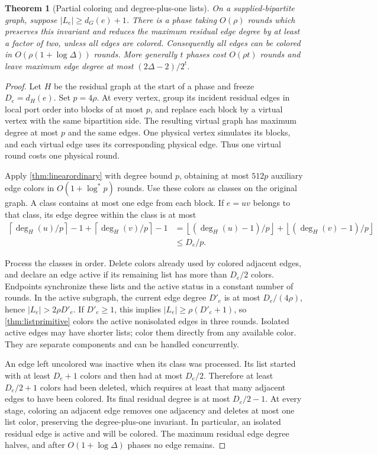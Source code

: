 \documentclass[11pt]{article}
\newtheorem{theorem}{Theorem}[section]
\theoremstyle{definition}
\theoremstyle{remark}
\newcommand{\ceil}[1]{\left\lceil #1\right\rceil}
\newcommand{\floor}[1]{\left\lfloor #1\right\rfloor}
\newcommand{\abs}[1]{\left|#1\right|}
\newcommand{\logstar}{\log^*}
\begin{document}
\begin{theorem}[Partial coloring and degree-plus-one lists]\label{thm:partial}
On a supplied-bipartite graph, suppose $\abs{L_e}\ge d_G(e)+1$.
There is a phase taking $O(\rho)$ rounds which preserves this invariant
and reduces the maximum residual edge degree by at least a factor of
two, unless all edges are colored. Consequently all edges can be
colored in $O(\rho(1+\log\Delta))$ rounds. More generally $t$ phases
cost $O(\rho t)$ rounds and leave maximum edge degree at most
$(2\Delta-2)/2^t$.
\end{theorem}
\begin{proof}
Let $H$ be the residual graph at the start of a phase and freeze
$D_e=d_H(e)$. Set $p=4\rho$. At every vertex, group its incident
residual edges in local port order into blocks of at most $p$, and
replace each block by a virtual vertex with the same bipartition side.
The resulting virtual graph has maximum degree at most $p$ and the
same edges. One physical vertex simulates its blocks, and each virtual
edge uses its corresponding physical edge. Thus one virtual round
costs one physical round.

Apply \cref{thm:linearordinary} with degree bound $p$, obtaining at
most $512p$ auxiliary edge colors in $O(1+\logstar p)$ rounds. Use
these colors as classes on the original graph. A class contains at
most one edge from each block. If $e=uv$ belongs to that class, its
edge degree within the class is at most
\begin{align*}
 \ceil{\deg_H(u)/p}-1+\ceil{\deg_H(v)/p}-1
 &=\floor{(\deg_H(u)-1)/p}+\floor{(\deg_H(v)-1)/p}\\
 &\le D_e/p.
\end{align*}

Process the classes in order. Delete colors already used by colored
adjacent edges, and declare an edge active if its remaining list has
more than $D_e/2$ colors. Endpoints synchronize these lists and the
active status in a constant number of rounds. In the active subgraph,
the current edge degree $D'_e$ is at most $D_e/(4\rho)$, hence
$\abs{L_e}>2\rho D'_e$. If $D'_e\ge1$, this implies
$\abs{L_e}\ge\rho(D'_e+1)$, so \cref{thm:listprimitive} colors the
active nonisolated edges in three rounds. Isolated active edges may
have shorter lists; color them directly from any available color.
They are separate components and can be handled concurrently.

An edge left uncolored was inactive when its class was processed.
Its list started with at least $D_e+1$ colors and then had at most
$D_e/2$. Therefore at least $D_e/2+1$ colors had been deleted, which
requires at least that many adjacent edges to have been colored.
Its final residual degree is at most $D_e/2-1$.
At every stage, coloring an adjacent edge removes one adjacency and
deletes at most one list color, preserving the degree-plus-one
invariant. In particular, an isolated residual edge is active and
will be colored. The maximum residual edge degree halves, and after
$O(1+\log\Delta)$ phases no edge remains.


\end{proof}
\end{document}

